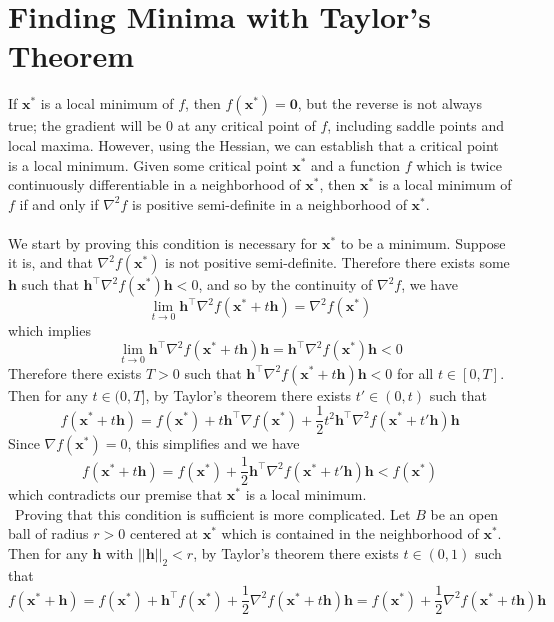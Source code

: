 \documentclass{article}
\begin{document}
\section{Finding Minima with Taylor's Theorem}
If $\mathbf{x}^*$ is a local minimum of $f$, then $f(\mathbf{x}^*) = \mathbf{0}$, but the reverse is not always true; the gradient will be 0 at any critical point of $f$, including saddle points and local maxima. However, using the Hessian, we can establish that a critical point is a local minimum. Given some critical point $\mathbf{x}^*$ and a function $f$ which is twice continuously differentiable in a neighborhood of $\mathbf{x}^*$, then $\mathbf{x^*}$ is a local minimum of $f$ if and only if $\nabla^2 f$ is positive semi-definite in a neighborhood of $\mathbf{x}^*$. \\\\
We start by proving this condition is necessary for $\mathbf{x}^*$ to be a minimum. Suppose it is, and that $\nabla^2 f(\mathbf{x}^*)$ is not positive semi-definite. Therefore there exists some $\mathbf{h}$ such that $\mathbf{h}^\top\nabla^2f(\mathbf{x}^*)\mathbf{h} < 0$, and so by the continuity of $\nabla^2f$, we have 
$$\lim_{t\rightarrow 0} \mathbf{h}^\top\nabla^2f(\mathbf{x^*} + t\mathbf{h}) = \nabla^2f(\mathbf{x}^*)$$
which implies
$$\lim_{t\rightarrow 0}\mathbf{h}^\top\nabla^2f(\mathbf{x}^* + t\mathbf{h})\mathbf{h} = \mathbf{h}^\top\nabla^2f(\mathbf{x}^*)\mathbf{h} < 0$$
Therefore there exists $T > 0$ such that $\mathbf{h}^\top\nabla^2f(\mathbf{x}^* + t\mathbf{h})\mathbf{h} < 0$ for all $t \in [0, T]$. Then for any $t \in (0, T]$,  by Taylor's theorem there exists $t' \in (0, t)$ such that 
$$f(\mathbf{x}^* + t\mathbf{h}) = f(\mathbf{x}^*) + t\mathbf{h}^\top \nabla f(\mathbf{x}^*) + \frac{1}{2}t^2\mathbf{h}^\top\nabla^2f(\mathbf{x}^* + t'\mathbf{h})\mathbf{h}$$
Since $\nabla f(\mathbf{x}^*) = 0$, this simplifies and we have
$$ f(\mathbf{x}^* + t\mathbf{h}) = f(\mathbf{x}^*) + \frac{1}{2}\mathbf{h}^\top\nabla^2 f(\mathbf{x}^* + t'\mathbf{h})\mathbf{h} < f(\mathbf{x}^*)$$
which contradicts our premise that $\mathbf{x}^*$ is a local minimum. \\\
Proving that this condition is sufficient is more complicated. Let $B$ be an open ball of radius $r > 0$ centered at $\mathbf{x}^*$ which is contained in the neighborhood of $\mathbf{x}^*$. Then for any $\mathbf{h}$ with $||\mathbf{h}||_2 < r$, by Taylor's theorem there exists $t \in (0, 1)$ such that
$$f(\mathbf{x^* + h}) = f(\mathbf{x^*}) + \mathbf{h}^\top f(\mathbf{x^*}) + \frac{1}{2}\nabla^2 f(\mathbf{x}^* + t\mathbf{h})\mathbf{h} = f(\mathbf{x}^*) + \frac{1}{2}\nabla^2 f(\mathbf{x^*} + t\mathbf{h})\mathbf{h}$$
\end{document}
